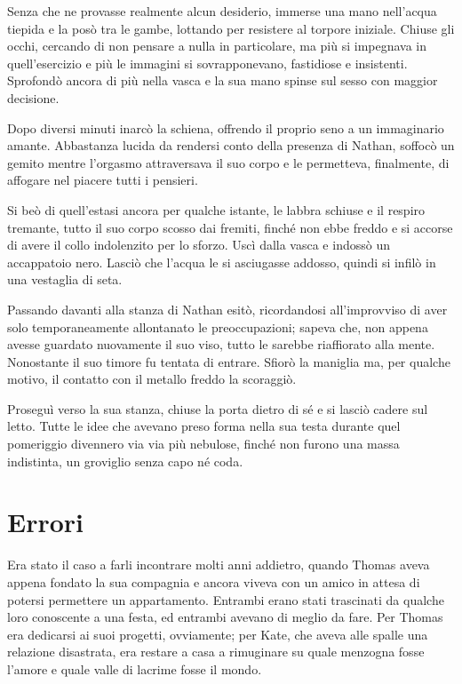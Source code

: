 \documentclass[a4paper,oneside,9pt]{memoir}
\begin{document}
Senza che ne provasse realmente alcun desiderio, immerse una mano nell'acqua tiepida e la posò tra le gambe, lottando
per resistere al torpore iniziale. Chiuse gli occhi, cercando di non pensare a nulla in particolare, ma più si
impegnava in quell'esercizio e più le immagini si sovrapponevano, fastidiose e insistenti. Sprofondò ancora di più
nella vasca e la sua mano spinse sul sesso con maggior decisione.

Dopo diversi minuti inarcò la schiena, offrendo il proprio seno a un immaginario amante. Abbastanza lucida da rendersi
conto della presenza di Nathan, soffocò un gemito mentre l'orgasmo attraversava il suo corpo e le permetteva,
finalmente, di affogare nel piacere tutti i pensieri.

Si beò di quell'estasi ancora per qualche istante, le labbra schiuse e il respiro tremante, tutto il suo corpo scosso
dai fremiti, finché non ebbe freddo e si accorse di avere il collo indolenzito per lo sforzo. Uscì dalla vasca e
indossò un accappatoio nero. Lasciò che l'acqua le si asciugasse addosso, quindi si infilò in una vestaglia di seta.

Passando davanti alla stanza di Nathan esitò, ricordandosi all'improvviso di aver solo temporaneamente allontanato le
preoccupazioni; sapeva che, non appena avesse guardato nuovamente il suo viso, tutto le sarebbe riaffiorato alla mente.
Nonostante il suo timore fu tentata di entrare. Sfiorò la maniglia ma, per qualche motivo, il contatto con il metallo
freddo la scoraggiò.

Proseguì verso la sua stanza, chiuse la porta dietro di sé e si lasciò cadere sul letto. Tutte le idee che avevano
preso forma nella sua testa durante quel pomeriggio divennero via via più nebulose, finché non furono una massa
indistinta, un groviglio senza capo né coda.

\chapter{Errori}

Era stato il caso a farli incontrare molti anni addietro, quando Thomas aveva appena fondato la sua compagnia e ancora
viveva con un amico in attesa di potersi permettere un appartamento. Entrambi erano stati trascinati da qualche loro
conoscente a una festa, ed entrambi avevano di meglio da fare. Per Thomas era dedicarsi ai suoi progetti, ovviamente;
per Kate, che aveva alle spalle una relazione disastrata, era restare a casa a rimuginare su quale menzogna fosse
l'amore e quale valle di lacrime fosse il mondo.
\end{document}
